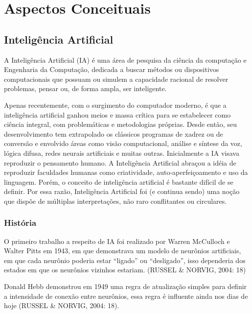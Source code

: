 \chapter{Aspectos Conceituais}

\section{Inteligência Artificial}


A Inteligência Artificial (IA) é uma área de pesquisa da ciência da computação e Engenharia da Computação, dedicada a buscar métodos ou dispositivos computacionais que possuam ou simulem a capacidade racional de resolver problemas, pensar ou, de forma ampla, ser inteligente.

Apenas recentemente, com o surgimento do computador moderno, é que a inteligência artificial ganhou meios e massa crítica para se estabelecer como ciência integral, com problemáticas e metodologias próprias. Desde então, seu desenvolvimento tem extrapolado os clássicos programas de xadrez ou de conversão e envolvido áreas como visão computacional, análise e síntese da voz, lógica difusa, redes neurais artificiais e muitas outras.
Inicialmente a IA visava reproduzir o pensamento humano. A Inteligência Artificial abraçou a idéia de reproduzir faculdades humanas como criatividade, auto-aperfeiçoamento e uso da linguagem. Porém, o conceito de inteligência artificial é bastante difícil de se definir. Por essa razão, Inteligência Artificial foi (e continua sendo) uma noção que dispõe de múltiplas interpretações, não raro conflitantes ou circulares.

\subsection{História}

O primeiro trabalho a respeito de IA foi realizado por Warren McCulloch e Walter Pitts em 1943, em que demonstrava um modelo de neurônios artificiais, em que cada neurônio poderia estar ``ligado'' ou ``desligado'', isso dependeria dos estados em que os neurônios vizinhos estariam. (RUSSEL \& NORVIG, 2004: 18)

Donald Hebb demonstrou em 1949 uma regra de atualização simples para definir a intensidade de conexão entre neurônios, essa regra é influente ainda nos dias de hoje (RUSSEL \& NORVIG, 2004: 18).

